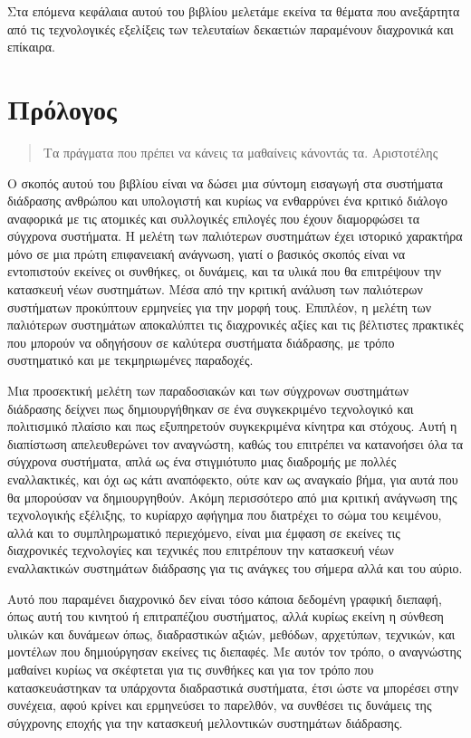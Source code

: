 \documentclass[
]{article}
\begin{document}
Στα επόμενα κεφάλαια αυτού του βιβλίου μελετάμε εκείνα τα θέματα που
ανεξάρτητα από τις τεχνολογικές εξελίξεις των τελευταίων δεκαετιών
παραμένουν διαχρονικά και επίκαιρα.

\hypertarget{ux3c0ux3c1ux3ccux3bbux3bfux3b3ux3bfux3c2}{%
\section{Πρόλογος}\label{ux3c0ux3c1ux3ccux3bbux3bfux3b3ux3bfux3c2}}

\begin{quote}
Τα πράγματα που πρέπει να κάνεις τα μαθαίνεις κάνοντάς τα. Αριστοτέλης
\end{quote}

Ο σκοπός αυτού του βιβλίου είναι να δώσει μια σύντομη εισαγωγή στα
συστήματα διάδρασης ανθρώπου και υπολογιστή και κυρίως να ενθαρρύνει ένα
κριτικό διάλογο αναφορικά με τις ατομικές και συλλογικές επιλογές που
έχουν διαμορφώσει τα σύγχρονα συστήματα. Η μελέτη των παλιότερων
συστημάτων έχει ιστορικό χαρακτήρα μόνο σε μια πρώτη επιφανειακή
ανάγνωση, γιατί ο βασικός σκοπός είναι να εντοπιστούν εκείνες οι
συνθήκες, οι δυνάμεις, και τα υλικά που θα επιτρέψουν την κατασκευή νέων
συστημάτων. Μέσα από την κριτική ανάλυση των παλιότερων συστήματων
προκύπτουν ερμηνείες για την μορφή τους. Επιπλέον, η μελέτη των
παλιότερων συστημάτων αποκαλύπτει τις διαχρονικές αξίες και τις
βέλτιστες πρακτικές που μπορούν να οδηγήσουν σε καλύτερα συστήματα
διάδρασης, με τρόπο συστηματικό και με τεκμηριωμένες παραδοχές.

Μια προσεκτική μελέτη των παραδοσιακών και των σύγχρονων συστημάτων
διάδρασης δείχνει πως δημιουργήθηκαν σε ένα συγκεκριμένο τεχνολογικό και
πολιτισμικό πλαίσιο και πως εξυπηρετούν συγκεκριμένα κίνητρα και
στόχους. Αυτή η διαπίστωση απελευθερώνει τον αναγνώστη, καθώς του
επιτρέπει να κατανοήσει όλα τα σύγχρονα συστήματα, απλά ως ένα
στιγμιότυπο μιας διαδρομής με πολλές εναλλακτικές, και όχι ως κάτι
αναπόφεκτο, ούτε καν ως αναγκαίο βήμα, για αυτά που θα μπορούσαν να
δημιουργηθούν. Ακόμη περισσότερο από μια κριτική ανάγνωση της
τεχνολογικής εξέλιξης, το κυρίαρχο αφήγημα που διατρέχει το σώμα του
κειμένου, αλλά και το συμπληρωματικό περιεχόμενο, είναι μια έμφαση σε
εκείνες τις διαχρονικές τεχνολογίες και τεχνικές που επιτρέπουν την
κατασκευή νέων εναλλακτικών συστημάτων διάδρασης για τις ανάγκες του
σήμερα αλλά και του αύριο.

Αυτό που παραμένει διαχρονικό δεν είναι τόσο κάποια δεδομένη γραφική
διεπαφή, όπως αυτή του κινητού ή επιτραπέζιου συστήματος, αλλά κυρίως
εκείνη η σύνθεση υλικών και δυνάμεων όπως, διαδραστικών αξιών, μεθόδων,
αρχετύπων, τεχνικών, και μοντέλων που δημιούργησαν εκείνες τις διεπαφές.
Με αυτόν τον τρόπο, ο αναγνώστης μαθαίνει κυρίως να σκέφτεται για τις
συνθήκες και για τον τρόπο που κατασκευάστηκαν τα υπάρχοντα διαδραστικά
συστήματα, έτσι ώστε να μπορέσει στην συνέχεια, αφού κρίνει και
ερμηνεύσει το παρελθόν, να συνθέσει τις δυνάμεις της σύγχρονης εποχής
για την κατασκευή μελλοντικών συστημάτων διάδρασης.
\end{document}
